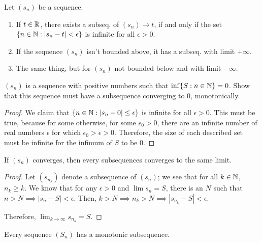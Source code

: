 \documentclass{book}
\begin{document}
\begin{thm}
    Let $(s_n)$ be a sequence.
    \begin{enumerate}[label = (\roman*)]
        \item If $t \in \mathbb{R}$, there exists a subseq. of $(s_n) \to t$, if and only if the set $\{n \in \mathbb{N} : |s_n - t| < \epsilon\}$ is infinite for all $\epsilon > 0$.
        \item If the sequence $(s_n)$ isn't bounded above, it has a subseq. with limit $+\infty$.
        \item The same thing, but for $(s_n)$ not bounded below and with limit $-\infty$.
    \end{enumerate}
\end{thm}

\begin{ex}
    $(s_n)$ is a sequence with positive numbers such that $\inf \{ S : n \in \mathbb{N} \} = 0$. Show that this sequence must have a subsequence converging to $0$, monotonically.
\end{ex}

\begin{proof}
    We claim that $\{n \in \mathbb{N} : |s_n - 0| \le \epsilon\}$ is infinite for all $\epsilon > 0$. This must be true, because for some otherwise, for some $\epsilon_0 > 0$, there are an infinite number of real numbers $\epsilon$ for which $\epsilon_0 > \epsilon > 0$. Therefore, the size of each described set must be infinite for the infimum of $S$ to be $0$.
\end{proof}

\begin{thm}
    If $(s_n)$ converges, then every subsequences converges to the same limit.
\end{thm}
 
\begin{proof}
    Let $(s_{n_k})$ denote a subsequence of $(s_n)$; we see that for all $k \in \mathbb{N}$, $n_k \geq k$. We know that for any $\epsilon > 0$ and $\lim s_n = S$, there is an $N$ such that $n > N \implies |s_n - S| < \epsilon$. Then, $k > N \implies n_k > N \implies |s_{n_k} - S| < \epsilon$.

    Therefore, $\lim_{k \to \infty} s_{n_k} = S$.
\end{proof}

\begin{thm}
    Every sequence $(S_n)$ has a monotonic subsequence.
\end{thm}
\end{document}

